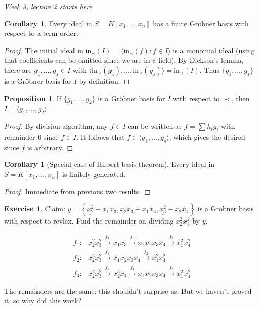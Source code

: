 \documentclass[a4paper]{article}
\newcommand{\In}{\text{in}}
\theoremstyle{definition}
\newtheorem{prop}[defn]{Proposition}
\newtheorem{coro}[defn]{Corollary}
\newtheorem{exe}[defn]{Exercise}
\begin{document}
\begin{flushright}
\textit{Week 3, lecture 2 starts here}
\end{flushright}

\begin{coro}
Every ideal in $S=K[x_1,\ldots,x_n]$ has a finite Gröbner basis with respect to a term order.
\end{coro}
\begin{proof}
The initial ideal in $\In_\prec(I)=\langle \In_\prec(f):f\in I\rangle$ is a monomial ideal (using that coefficients can be omitted since we are in a field). By Dickson's lemma, there are $g_1,\ldots,g_s\in I$ with $\langle \In_\prec(g_1),\ldots,\In_\prec(g_s)\rangle=\In_\prec(I)$. Thus $\{g_1,\ldots,g_s\}$ is a Gröbner basis for $I$ by definition.
\end{proof}

\begin{prop}
If $\{g_1,\ldots,g_2\}$ is a Gröbner basis for $I$ with respect to $\prec$, then $I=\langle g_1,\ldots,g_2\rangle$.
\end{prop}
\begin{proof}
By division algorithm, any $f\in I$ can be written as $f=\sum h_i g_i$ with remainder 0 since $f\in I$. It follows that $f\in\langle g_1,\ldots,g_s\rangle$, which gives the desired since $f$ is arbitrary.
\end{proof}

\begin{coro}[Special case of Hilbert basis theorem]
Every ideal in $S=K[x_1,\ldots,x_n]$ is finitely generated.
\end{coro}
\begin{proof}
Immediate from previous two results.
\end{proof}
\begin{exe}
Claim: $y=\left\{\underline{x_2^2}-x_1x_3,\underline{x_2x_3}-x_1x_4,\underline{x_3^2}-x_2x_4\right\}$ is a Gröbner basis with respect to revlex. Find the remainder on dividing $x_2^2x_3^2$ by $y$.

\[
\begin{aligned}
f_1:& x_2^2x_3^2 \xrightarrow{f_1} x_1x_3\xrightarrow{f_3}x_1x_2x_3x_4\xrightarrow{f_2}x_1^2x_4^2 \\
f_2:& x_2^2x_3^2 \xrightarrow{f_2} x_1x_2x_3x_4\xrightarrow{f_2} x_1^2x_4^2 \\
f_3:& x_2^2x_3^2 \xrightarrow{f_3}x_2^3x_4\xrightarrow{f_1}x_1x_2x_3x_4\xrightarrow{f_2}x_1^2x_4^2
\end{aligned}
\]

The remainders are the same: this shouldn't surprise us. But we haven't proved it, so why did this work?
\end{exe}
\end{document}
